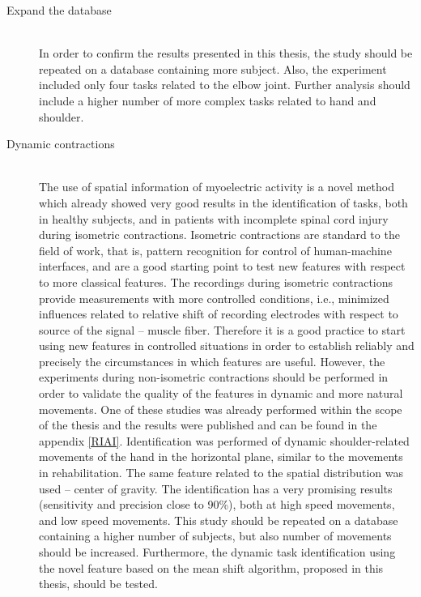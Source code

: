 \begin{description}
\item[Expand the database] \hfill \\
	In order to confirm the results presented in this thesis, the study should be repeated on a database containing more subject. Also, the experiment included only four tasks related to the elbow joint. Further analysis should include a higher number of more complex tasks related to hand and shoulder.

\item[Dynamic contractions] \hfill \\ 
	The use of spatial information of myoelectric activity is a novel method which already showed very good results in the identification of tasks, both in healthy subjects, and in patients with incomplete spinal cord injury during isometric contractions. Isometric contractions are standard to the field of work, that is, pattern recognition for control of human-machine interfaces, and are a good starting point to test new features with respect to more classical features. The recordings during isometric contractions provide measurements with more controlled conditions, i.e., minimized influences related to relative shift of recording electrodes with respect to source of the signal – muscle fiber. Therefore it is a good practice to start using new features in controlled situations in order to establish reliably and precisely the circumstances in which features are useful. However, the experiments during non-isometric contractions should be performed in order to validate the quality of the features in dynamic and more natural movements. One of these studies was already performed within the scope of the thesis and the results were published \citep{Rojas-Martinez2017} and can be found in the appendix \ref{RIAI}. Identification was performed of dynamic shoulder-related movements of the hand in the horizontal plane, similar to the movements in rehabilitation. The same feature related to the spatial distribution was used -- center of gravity. The identification has a very promising results (sensitivity and precision close to 90\%), both at high speed movements, and low speed movements. This study should be repeated on a database containing a higher number of subjects, but also number of movements should be increased. Furthermore, the dynamic task identification using the novel feature based on the mean shift algorithm, proposed in this thesis, should be tested. 
	
	
	

\end{description}

